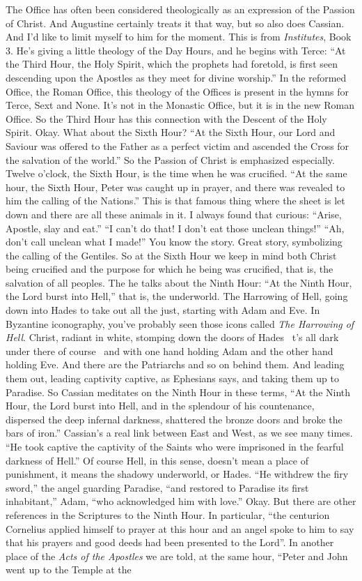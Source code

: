 The Office has often been considered theologically as an expression of the Passion of Christ. And Augustine certainly treats it that way, but so also does Cassian. And I'd like to limit myself to him for the moment. This is from \emph{Institutes}, Book 3. He's giving a little theology of the Day Hours, and he begins with Terce: ``At the Third Hour, the Holy Spirit, which the prophets had foretold, is first seen descending upon the Apostles as they meet for divine worship.'' In the reformed Office, the Roman Office, this theology of the Offices is present in the hymns for Terce, Sext and None. It's not in the Monastic Office, but it is in the new Roman Office. So the Third Hour has this connection with the Descent of the Holy Spirit. Okay. What about the Sixth Hour? ``At the Sixth Hour, our Lord and Saviour was offered to the Father as a perfect victim and ascended the Cross for the salvation of the world.'' So the Passion of Christ is emphasized especially. Twelve o'clock, the Sixth Hour, is the time when he was crucified. ``At the same hour, the Sixth Hour, Peter was caught up in prayer, and there was revealed to him the calling of the Nations.'' This is that famous thing where the sheet is let down and there are all these animals in it. I always found that curious: ``Arise, Apostle, slay and eat.'' ``I can't do that! I don't eat those unclean things!'' ``Ah, don't call unclean what I made!'' You know the story. Great story, symbolizing the calling of the Gentiles. So at the Sixth Hour we keep in mind both Christ being crucified and the purpose for which he being was crucified, that is, the salvation of all peoples. The he talks about the Ninth Hour: ``At the Ninth Hour, the Lord burst into Hell,'' that is, the underworld. The Harrowing of Hell, going down into Hades to take out all the just, starting with Adam and Eve. In Byzantine iconography, you've probably seen those icons called \emph{The Harrowing of Hell}. Christ, radiant in white, stomping down the doors of Hades \textemdash\ t's all dark under there of course \textemdash\ and with one hand holding Adam and the other hand holding Eve. And there are the Patriarchs and so on behind them. And leading them out, leading captivity captive, as Ephesians says, and taking them up to Paradise. So Cassian meditates on the Ninth Hour in these terms, ``At the Ninth Hour, the Lord burst into Hell, and in the splendour of his countenance, dispersed the deep infernal darkness, shattered the bronze doors and broke the bars of iron.'' Cassian's a real link between East and West, as we see many times. ``He took captive the captivity of the Saints who were imprisoned in the fearful darkness of Hell.'' Of course Hell, in this sense, doesn't mean a place of punishment, it means the shadowy underworld, or Hades. ``He withdrew the firy sword,'' the angel guarding Paradise, ``and restored to Paradise its first inhabitant,'' Adam, ``who acknowledged him with love.'' Okay. But there are other references in the Scriptures to the Ninth Hour. In particular, ``the centurion Cornelius applied himself to prayer at this hour and an angel spoke to him to say that his prayers and good deeds had been presented to the Lord''. In another place of the \emph{Acts of the Apostles} we are told, at the same hour, ``Peter and John went up to the Temple at the 